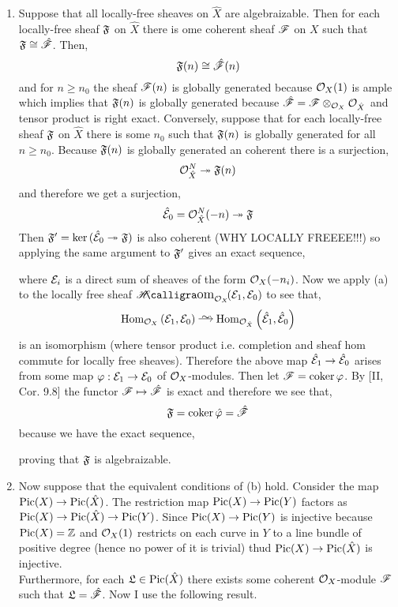 \documentclass[12pt]{article}
\begin{document}
\begin{enumerate}
\item Suppose that all locally-free sheaves on $\hat{X}$ are algebraizable. Then for each locally-free sheaf $\mathfrak{F}$ on $\hat{X}$ there is ome coherent sheaf $\mathscr{F}$ on $X$ such that $\mathfrak{F} \cong \hat{\mathscr{F}}$. Then,
\[ \mathfrak{F}(n) \cong \hat{\mathscr{F}}(n) \]
and for $n \ge n_0$ the sheaf $\mathscr{F}(n)$ is globally generated because $\mathcal{O}_{X}(1)$ is ample which implies that $\mathfrak{F}(n)$ is globally generated because $\hat{\mathscr{F}} = \mathscr{F} \otimes_{\mathcal{O}_{X}} \mathcal{O}_{\hat{X}}$ and tensor product is right exact. Conversely, suppose that for each locally-free sheaf $\mathfrak{F}$ on $\hat{X}$ there is some $n_0$ such that $\mathfrak{F}(n)$ is globally generated for all $n \ge n_0$. Because $\mathfrak{F}(n)$ is globally generated an coherent there is a surjection,
\[ \mathcal{O}_{\hat{X}}^N \twoheadrightarrow \mathfrak{F}(n) \]
and therefore we get a surjection,
\[ \hat{\mathcal{E}}_0 = \mathcal{O}_{\hat{X}}^N(-n) \twoheadrightarrow \mathfrak{F} \]
Then $\mathfrak{F}' = \ker{(\hat{\mathcal{E}}_0 \twoheadrightarrow\mathfrak{F})}$ is also coherent (WHY LOCALLY FREEEE!!!) so applying the same argument to $\mathfrak{F}'$ gives an exact sequence,
\begin{center}
\end{center}
where $\mathcal{E}_i$ is a direct sum of sheaves of the form $\mathcal{O}_{X}(-n_i)$. Now we apply (a) to the locally free sheaf $\shHom{\struct{X}}{\E_1}{\E_0}$ to see that,
\[ \Hom{\struct{X}}{\E_1}{\E_0} \iso \Hom{\struct{\hat{X}}}{\hat{\E}_1}{\hat{\E}_0} \]
is an isomorphism (where tensor product i.e. completion and sheaf hom commute for locally free sheaves). Therefore the above map $\hat{\mathcal{E}}_1 \to \hat{\mathcal{E}}_0$ arises from some map $\varphi : \mathcal{E}_1 \to \mathcal{E}_0$ of $\mathcal{O}_{X}$-modules. Then let $\mathscr{F} = \operatorname{\mathrm{coker}}{\varphi}$. By [II, Cor. 9.8] the functor $\mathscr{F} \mapsto \hat{\mathscr{F}}$ is exact and therefore we see that,
\[ \mathfrak{F} = \operatorname{\mathrm{coker}}{\hat{\varphi}} = \hat{\mathscr{F}} \]
because we have the exact sequence,
\begin{center}
\end{center}
proving that $\mathfrak{F}$ is algebraizable. 

\item Now suppose that the equivalent conditions of (b) hold. Consider the map $\mathrm{Pic}(X) \to \mathrm{Pic}(\hat{X})$. The restriction map $\mathrm{Pic}(X) \to \mathrm{Pic}(Y)$ factors as $\mathrm{Pic}(X) \to \mathrm{Pic}(\hat{X}) \to \mathrm{Pic}(Y)$. Since $\mathrm{Pic}(X) \to \mathrm{Pic}(Y)$ is injective because $\mathrm{Pic}(X) = \mathbb{Z}$ and $\mathcal{O}_{X}(1)$ restricts on each curve in $Y$ to a line bundle of positive degree (hence no power of it is trivial) thud $\mathrm{Pic}(X) \to \mathrm{Pic}(\hat{X})$ is injective. 
\bigskip\\
Furthermore, for each $\mathfrak{L} \in \mathrm{Pic}(\hat{X})$ there exists some coherent $\mathcal{O}_{X}$-module $\mathscr{F}$ such that $\mathfrak{L} = \hat{\mathscr{F}}$. Now I use the following result.


\end{enumerate}
\end{document}
